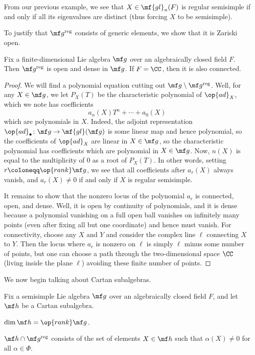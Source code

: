 \documentclass[../notes.tex]{subfiles}
\begin{document}
\begin{example}
	From our previous example, we see that $X\in\mf{gl}_n(F)$ is regular semisimple if and only if all its eigenvalues are distinct (thus forcing $X$ to be semisimple).
\end{example}
To justify that $\mf g^{\mathrm{reg}}$ consists of generic elements, we show that it is Zariski open.
\begin{lemma}
	Fix a finite-dimensional Lie algebra $\mf g$ over an algebraically closed field $F$. Then $\mf g^{\mathrm{reg}}$ is open and dense in $\mf g$. If $F=\CC$, then it is also connected.
\end{lemma}
\begin{proof}
	We will find a polynomial equation cutting out $\mf g\setminus\mf g^{\mathrm{reg}}$. Well, for any $X\in\mf g$, we let $P_X(T)$ be the characteristic polynomial of $\op{ad}_X$, which we note has coefficients
	\[a_n(X)T^n+\cdots+a_0(X)\]
	which are polynomials in $X$. Indeed, the adjoint representation $\op{ad}_\bullet\colon\mf g\to\mf{gl}(\mf g)$ is some linear map and hence polynomial, so the coefficients of $\op{ad}_X$ are linear in $X\in\mf g$, so the characteristic polynomial has coefficients which are polynomial in $X\in\mf g$. Now, $n(X)$ is equal to the multiplicity of $0$ as a root of $P_X(T)$. In other words, setting $r\coloneqq\op{rank}\mf g$, we see that all coefficients after $a_r(X)$ always vanish, and $a_r(X)\ne0$ if and only if $X$ is regular semisimple.

	It remains to show that the nonzero locus of the polynomial $a_r$ is connected, open, and dense. Well, it is open by continuity of polynomials, and it is dense because a polynomial vanishing on a full open ball vanishes on infinitely many points (even after fixing all but one coordinate) and hence must vanish. For connectivity, choose any $X$ and $Y$ and consider the complex line $\ell$ connecting $X$ to $Y$. Then the locus where $a_r$ is nonzero on $\ell$ is simply $\ell$ minus some number of points, but one can choose a path through the two-dimensional space $\CC$ (living inside the plane $\ell$) avoiding these finite number of points.
\end{proof}
We now begin talking about Cartan subalgebras.
\begin{lemma} \label{lem:regularity-check-cartan}
	Fix a semisimple Lie algebra $\mf g$ over an algebraically closed field $F$, and let $\mf h$ be a Cartan subalgebra.
	\begin{listalph}
		\item $\dim\mf h=\op{rank}\mf g$.
		\item $\mf h\cap\mf g^{\mathrm{reg}}$ consists of the set of elements $X\in\mf h$ such that $\alpha(X)\ne0$ for all $\alpha\in\Phi$.
	\end{listalph}
\end{lemma}
\end{document}
